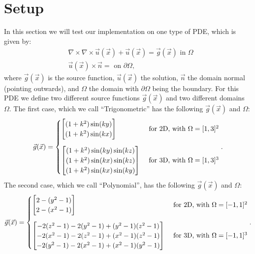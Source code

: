 \section{Setup}
In this section we will test our implementation on one type of PDE, which is given by:
\begin{align}
    &\nabla \times \nabla \times \vec{u}(\vec{x}) + \vec{u}(\vec{x}) = \vec{g}(\vec{x}) \text{ in } \Omega \label{eq:strong}\\
    &\vec{u}(\vec{x}) \times \vec n =  \text{ on } \partial \Omega\text{,} \label{eq:boundary}
\end{align}
where \(\vec g (\vec x)\) is the source function, \(\vec u (\vec x)\) the solution, \(\vec n\) the domain normal (pointing outwards), and \(\Omega\) the domain with \(\partial \Omega\) being the boundary. For this PDE we define two different source functions \(\vec g(\vec x)\) and two different domains \(\Omega\). The first case, which we call ``Trigonometric'' has the following \(\vec g(\vec x)\) and \(\Omega\):
\begin{align}
    \vec{g}(\vec x) = 
    \begin{cases}
        \begin{bmatrix}
            (1+k^2)\sin(k y)\\ (1+k^2)\sin(k x)
        \end{bmatrix} & \text{ for 2D, with }\Omega=[1,3]^2\\
        \noalign{\vskip9pt}
        \begin{bmatrix}
            (1 + k^2)\sin(k y)\sin(k z) \\
            (1 + k^2)\sin(k x)\sin(k z) \\
            (1 + k^2)\sin(k x)\sin(k y)
        \end{bmatrix} & \text{ for 3D, with }\Omega=[1,3]^3\\
    \end{cases}\text{.}
\end{align}
The second case, which we call ``Polynomial'', has the following \(\vec g(\vec x)\) and \(\Omega\):
\begin{align}
    \vec{g}(\vec x) = 
    \begin{cases}
        \begin{bmatrix}
            2 - (y^2 - 1)\\ 2 - (x^2 - 1)
        \end{bmatrix}& \text{ for 2D, with }\Omega=[-1,1]^2\\
        \noalign{\vskip9pt}
        \begin{bmatrix}
            -2 (z^2 - 1) - 2 (y^2 - 1) + (y^2 - 1) (z^2 - 1) \\
            -2 (x^2 - 1) - 2 (z^2 - 1) + (x^2 - 1) (z^2 - 1) \\
            -2 (y^2 - 1) - 2 (x^2 - 1) + (x^2 - 1) (y^2 - 1)
        \end{bmatrix}& \text{ for 3D, with }\Omega=[-1,1]^3
    \end{cases}\text{.}
\end{align}
